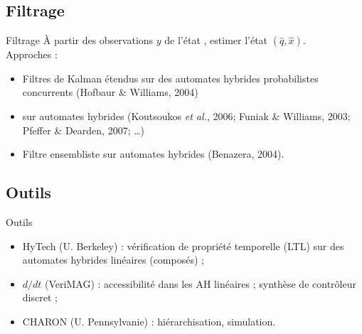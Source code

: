 \documentclass[compress]{beamer}
\begin{document}
\subsection{Filtrage}
\begin{frame}{Filtrage}
\`A partir des observations $y$ de l'état , estimer l'état  $(\hat{q}, \hat{x})$.\\
Approches :
\begin{itemize}
\item Filtres de Kalman étendus sur des automates hybrides probabilistes concurrents (Hofbaur \& Williams, 2004)\\
\item {} sur automates hybrides (Koutsoukos {\it et al.}, 2006; Funiak \& Williams, 2003; Pfeffer \& Dearden, 2007; \dots)
\item Filtre ensembliste sur automates hybrides (Benazera, 2004).
\end{itemize}
\end{frame}

\subsection{Outils}
\begin{frame}{Outils}
\begin{itemize}
\item HyTech (U. Berkeley) : vérification de propriété temporelle (LTL) sur des automates hybrides linéaires (composés) ;
\item $d/dt$ (VeriMAG) : accessibilité dans les AH linéaires ; synthèse de contrôleur discret ;
\item CHARON (U. Pennsylvanie) : hiérarchisation, simulation.
\end{itemize}
\end{frame}
\end{document}
